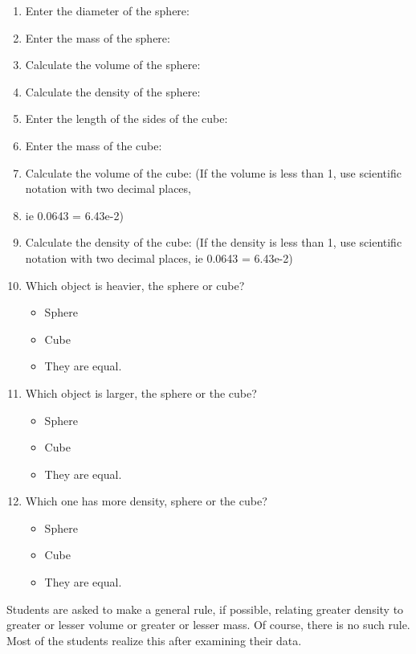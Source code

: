 \documentclass[11.5pt]{sig-alternate} %
\begin{document}
\begin{large}
\begin{enumerate}[label=\alph*)]
    \item  Enter the diameter of the sphere:
    \item  Enter the mass of the sphere:
    \item  Calculate the volume of the sphere:
    \item  Calculate the density of the sphere:
    \item  Enter the length of the sides of the cube:
    \item  Enter the mass of the cube:
    \item  Calculate the volume of the cube: (If the volume is less than 1, use scientific notation with two decimal places,
    \item ie 0.0643 = 6.43e-2)
    \item Calculate the density of the cube: (If the density is less than 1, use scientific notation with two decimal places, ie 0.0643 = 6.43e-2)
    \newpage
    \item  Which object is heavier, the sphere or cube?
\begin{itemize}
    \item Sphere
    \item Cube
    \item They are equal.
\end{itemize}
    \item  Which object is larger, the sphere or the cube?
\begin{itemize}
    \item Sphere
    \item Cube
    \item They are equal.
\end{itemize}
    \item  Which one has more density, sphere or the cube?
\begin{itemize}
    \item Sphere
    \item Cube
    \item They are equal.
\end{itemize}
\end{enumerate}

Students are asked to make a general rule, if possible, relating greater density to greater or lesser volume or greater or lesser mass. Of course, there is no such rule. Most of the students realize this after examining their data.

\end{large}
\clearpage
\end{document}
